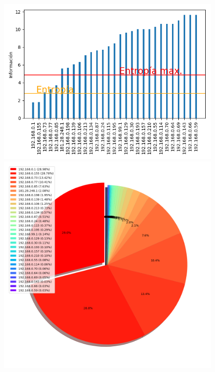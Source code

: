 \begin{figure}
\hspace*{-1.5cm}
 \includegraphics[scale=0.6]{../plots/trabajo_s2_informacion.png}
 \includegraphics[scale=0.4]{../plots/trabajo_s2_probabilidades.png}



\end{figure}
